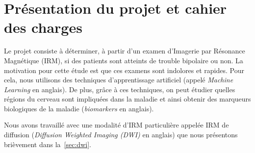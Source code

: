 \chapter{Présentation du projet et cahier des charges}

Le projet consiste à déterminer, à partir d'un examen d'Imagerie par Résonance Magnétique (IRM), si des patients sont atteints de trouble bipolaire ou non.
La motivation pour cette étude est que ces examens sont indolores et rapides.
Pour cela, nous utilisons des techniques d'apprentissage artificiel (appelé \textit{Machine Learning} en anglais).
De plus, grâce à ces techniques, on peut étudier quelles régions du cerveau sont impliquées dans la maladie et ainsi
obtenir des marqueurs biologiques de la maladie (\textit{biomarkers} en anglais).

Nous avons travaillé avec une modalité d'IRM particulière appelée IRM de diffusion (\textit{Diffusion Weighted Imaging (DWI)} en anglais)
que nous présentons brièvement dans la~\autoref{sec:dwi}.





